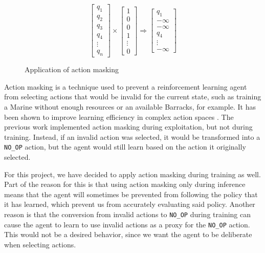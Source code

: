 \begin{figure}[t]
    \begin{equation*}
        \begin{bmatrix}
        q_1 \\ q_2 \\ q_3 \\ q_4 \\ \vdots \\ q_n
        \end{bmatrix}
        \times 
        \begin{bmatrix}
        1 \\ 0 \\ 0 \\ 1 \\ \vdots \\ 0
        \end{bmatrix}
        \Rightarrow 
        \begin{bmatrix}
        q_1 \\ -\infty \\ -\infty \\ q_4 \\ \vdots \\ -\infty
        \end{bmatrix}
    \end{equation*}
\caption{Application of action masking}
\label{fig:action_masking}
\end{figure}

Action masking is a technique used to prevent a reinforcement learning agent from selecting actions that would be invalid for the current state, such as training a Marine without enough resources or an available Barracks, for example. It has been shown to improve learning efficiency in complex action spaces \cite{Huang:2022}. The previous work implemented action masking during exploitation, but not during training. Instead, if an invalid action was selected, it would be transformed into a \texttt{NO\_OP} action, but the agent would still learn based on the action it originally selected.

For this project, we have decided to apply action masking during training as well. Part of the reason for this is that using action masking only during inference means that the agent will sometimes be prevented from following the policy that it has learned, which prevent us from accurately evaluating said policy. Another reason is that the conversion from invalid actions to \texttt{NO\_OP} during training can cause the agent to learn to use invalid actions as a proxy for the \texttt{NO\_OP} action. This would not be a desired behavior, since we want the agent to be deliberate when selecting actions.

